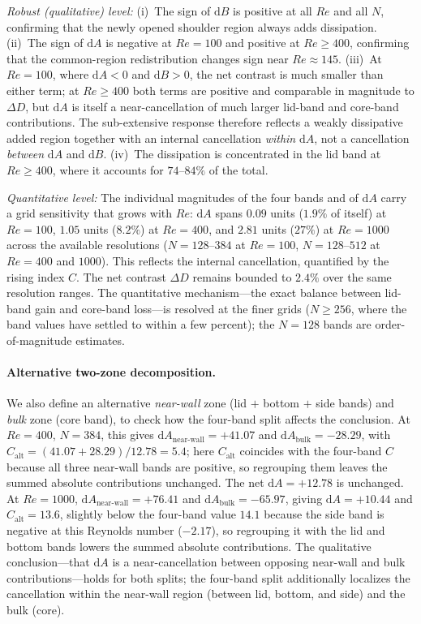 \emph{Robust (qualitative) level:} (i)~The sign of $\mathrm{d}B$ is positive at all $Re$ and all $N$, confirming that the newly opened shoulder region always adds dissipation. (ii)~The sign of $\mathrm{d}A$ is negative at $Re=100$ and positive at $Re\geq 400$, confirming that the common-region redistribution changes sign near $Re\approx 145$. (iii)~At $Re=100$, where $\mathrm{d}A<0$ and $\mathrm{d}B>0$, the net contrast is much smaller than either term; at $Re\ge400$ both terms are positive and comparable in magnitude to $\Delta D$, but $\mathrm{d}A$ is itself a near-cancellation of much larger lid-band and core-band contributions. The sub-extensive response therefore reflects a weakly dissipative added region together with an internal cancellation \emph{within} $\mathrm{d}A$, not a cancellation \emph{between} $\mathrm{d}A$ and $\mathrm{d}B$. (iv)~The dissipation is concentrated in the lid band at $Re\geq 400$, where it accounts for $74$--$84\%$ of the total.

\emph{Quantitative level:} The individual magnitudes of the four bands and of $\mathrm{d}A$ carry a grid sensitivity that grows with $Re$: $\mathrm{d}A$ spans $0.09$ units ($1.9\%$ of itself) at $Re=100$, $1.05$ units ($8.2\%$) at $Re=400$, and $2.81$ units ($27\%$) at $Re=1000$ across the available resolutions ($N=128$--$384$ at $Re=100$, $N=128$--$512$ at $Re=400$ and $1000$). This reflects the internal cancellation, quantified by the rising index $C$. The net contrast $\Delta D$ remains bounded to $2.4\%$ over the same resolution ranges. The quantitative mechanism---the exact balance between lid-band gain and core-band loss---is resolved at the finer grids ($N\ge256$, where the band values have settled to within a few percent); the $N=128$ bands are order-of-magnitude estimates.

\paragraph{Alternative two-zone decomposition.}
We also define an alternative \emph{near-wall} zone (lid $+$ bottom $+$ side bands) and \emph{bulk} zone (core band), to check how the four-band split affects the conclusion. At $Re=400$, $N=384$, this gives $\mathrm{d}A_{\text{near-wall}} = +41.07$ and $\mathrm{d}A_{\text{bulk}} =-28.29$, with $C_{\text{alt}} = (41.07 + 28.29)/12.78 = 5.4$; here $C_{\text{alt}}$ coincides with the four-band $C$ because all three near-wall bands are positive, so regrouping them leaves the summed absolute contributions unchanged. The net $\mathrm{d}A = +12.78$ is unchanged. At $Re=1000$, $\mathrm{d}A_{\text{near-wall}} = +76.41$ and $\mathrm{d}A_{\text{bulk}} = -65.97$, giving $\mathrm{d}A = +10.44$ and $C_{\text{alt}} = 13.6$, slightly below the four-band value $14.1$ because the side band is negative at this Reynolds number ($-2.17$), so regrouping it with the lid and bottom bands lowers the summed absolute contributions. The qualitative conclusion---that $\mathrm{d}A$ is a near-cancellation between opposing near-wall and bulk contributions---holds for both splits; the four-band split additionally localizes the cancellation within the near-wall region (between lid, bottom, and side) and the bulk (core).

